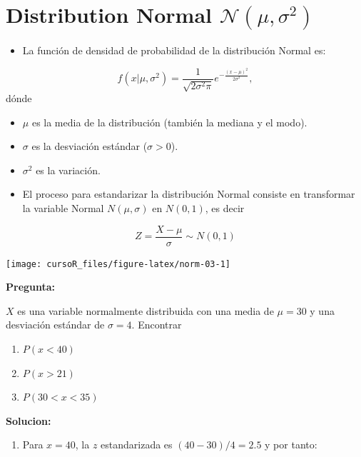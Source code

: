 \documentclass[]{book}
\providecommand{\tightlist}{%
  \setlength{\itemsep}{0pt}\setlength{\parskip}{0pt}}
\begin{document}
\section{\texorpdfstring{Distribution Normal
\(\mathcal{N}(\mu,\sigma^2)\)}{Distribution Normal \textbackslash{}mathcal\{N\}(\textbackslash{}mu,\textbackslash{}sigma\^{}2)}}\label{distribution-normal-mathcalnmusigma2}

\begin{itemize}
\tightlist
\item
  La función de densidad de probabilidad de la distribución Normal es:
\end{itemize}

\[
f(x | \mu,\sigma^2) = \frac{1}{\sqrt{2\sigma^2\pi}} e ^{-\frac{(x-\mu)^2}{2\sigma^2}},
\] dónde

\begin{itemize}
\item
  \(\mu\) es la media de la distribución (también la mediana y el modo).
\item
  \(\sigma\) es la desviación estándar (\(\sigma>0\)).
\item
  \(\sigma^2\) es la variación.
\item
  El proceso para estandarizar la distribución Normal consiste en
  transformar la variable Normal \(N(\mu,\sigma)\) en \(N(0,1)\), es
  decir
\end{itemize}

\[
Z = \frac{X-\mu}{\sigma} \sim N(0,1)
\]

\begin{center}\texttt{[image: cursoR\_files/figure-latex/norm-03-1]} \end{center}

\textbf{Pregunta:}

\(X\) es una variable normalmente distribuida con una media de
\(\mu = 30\) y una desviación estándar de \(\sigma = 4\). Encontrar

\begin{enumerate}
\def\labelenumi{\alph{enumi})}
\item
  \(P(x<40)\)
\item
  \(P(x>21)\)
\item
  \(P(30<x<35)\)
\end{enumerate}

\textbf{Solucion:}

\begin{enumerate}
\def\labelenumi{\alph{enumi})}
\tightlist
\item
  Para \(x=40\), la \(z\) estandarizada es \((40-30)/4=2.5\) y por
  tanto:
\end{enumerate}
\end{document}
